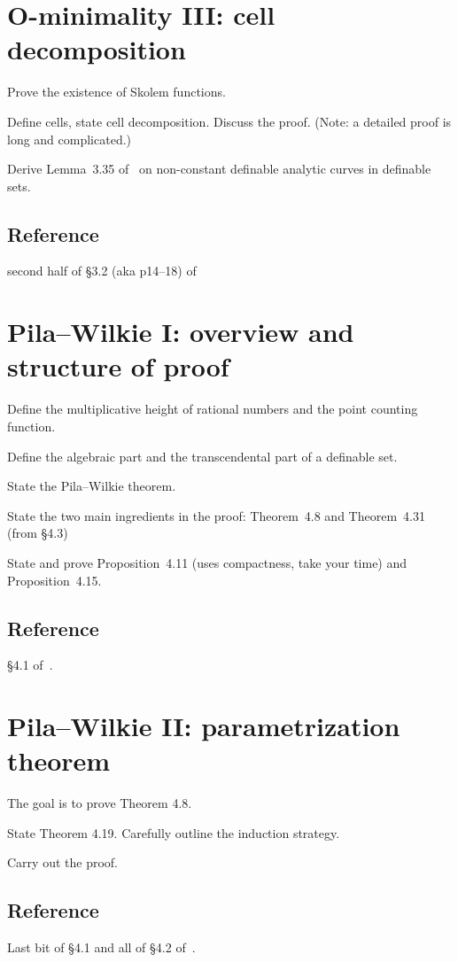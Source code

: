 \documentclass[10pt, a4paper]{amsart}
\begin{document}
\section{O-minimality III: cell decomposition}

Prove the existence of Skolem functions.

Define cells, state cell decomposition. Discuss the proof.
(Note: a detailed proof is long and complicated.)

Derive Lemma~3.35 of~\cite{scanlon} on non-constant definable analytic curves
in definable sets.

\subsection*{Reference} second half of \S3.2 (aka p14--18) of~\cite{scanlon}

\section{Pila--Wilkie I: overview and structure of proof}

Define the multiplicative height of rational numbers and the point counting function.

Define the algebraic part and the transcendental part of a definable set.

State the Pila--Wilkie theorem.

State the two main ingredients in the proof:
Theorem~4.8 and Theorem~4.31 (from \S4.3)

State and prove Proposition~4.11 (uses compactness, take your time) and Proposition~4.15.

\subsection*{Reference} \S4.1 of~\cite{scanlon}.

\section{Pila--Wilkie II: parametrization theorem}

The goal is to prove Theorem 4.8.

State Theorem 4.19. Carefully outline the induction strategy.

Carry out the proof.

\subsection*{Reference} Last bit of \S4.1 and all of \S4.2 of~\cite{scanlon}.
\end{document}
